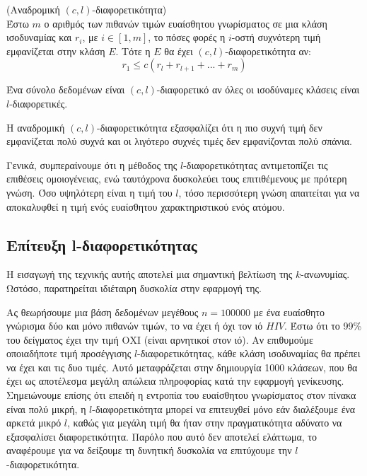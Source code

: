  \begin{definition}(Αναδρομική $(c,l)$-διαφορετικότητα)\\
 Έστω $m$ ο αριθμός των πιθανών τιμών ευαίσθητου γνωρίσματος σε μια κλάση ισοδυναμίας και $r_i$, με $i \in [1,m]$, το πόσες φορές η $i$-οστή συχνότερη τιμή εμφανίζεται στην κλάση $E$. Τότε η $E$ θα έχει $(c,l)$-διαφορετικότητα αν:
 $$r_1\leq c(r_l+r_{l+1}+...+r_m)$$
 \end{definition}
 
 
 \begin{definition}
Ένα σύνολο δεδομένων είναι $(c,l)$-διαφορετικό αν όλες οι ισοδύναμες κλάσεις είναι $l$-διαφορετικές.
\end{definition}
Η αναδρομική $(c, l)$-διαφορετικότητα εξασφαλίζει ότι η πιο συχνή τιμή δεν εμφανίζεται πολύ συχνά και οι λιγότερο συχνές τιμές δεν εμφανίζονται πολύ σπάνια.
 
 Γενικά, συμπεραίνουμε ότι η μέθοδος της $l$-διαφορετικότητας αντιμετοπίζει τις επιθέσεις ομοιογένειας, ενώ ταυτόχρονα δυσκολεύει τους επιτιθέμενους με πρότερη γνώση. Όσο υψηλότερη είναι η τιμή του $l$, τόσο περισσότερη γνώση απαιτείται για να αποκαλυφθεί η τιμή ενός ευαίσθητου χαρακτηριστικού ενός ατόμου. 
 
 
 
 \subsection{Επίτευξη \textlatin{l}-διαφορετικότητας}
 
 Η εισαγωγή της τεχνικής αυτής αποτελεί μια σημαντική βελτίωση της $k$-ανωνυμίας. Ωστόσο, παρατηρείται ιδιέταιρη δυσκολία στην εφαρμογή της.
 
 
 
 Ας θεωρήσουμε μια βάση δεδομένων μεγέθους $n=100000$ με ένα ευαίσθητο γνώρισμα δύο και μόνο πιθανών τιμών, το να έχει ή όχι τον ιό $HIV$. Έστω ότι το 99\% του δείγματος έχει την τιμή ΟΧΙ (είναι αρνητικοί στον ιό). Αν επιθυμούμε οποιαδήποτε τιμή προσέγγισης $l$-διαφορετικότητας, κάθε κλάση ισοδυναμίας θα πρέπει να έχει και τις δυο τιμές. Αυτό μεταφράζεται στην δημιουργία 1000 κλάσεων, που θα έχει ως αποτέλεσμα μεγάλη απώλεια πληροφορίας κατά την εφαρμογή γενίκευσης. Σημειώνουμε επίσης ότι επειδή η εντροπία του ευαίσθητου γνωρίσματος στον πίνακα είναι πολύ μικρή, η $l$-διαφορετικότητα μπορεί να επιτευχθεί μόνο εάν διαλέξουμε ένα αρκετά μικρό $l$, καθώς για μεγάλη τιμή θα ήταν στην πραγματικότητα αδύνατο να εξασφαλίσει διαφορετικότητα. Παρόλο που αυτό δεν αποτελεί ελάττωμα, το αναφέρουμε για να δείξουμε τη δυνητική δυσκολία να επιτύχουμε την $l$-διαφορετικότητα.
 
